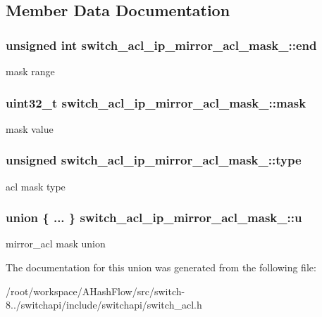 \subsection{Member Data Documentation}
\hypertarget{unionswitch__acl__ip__mirror__acl__mask___ab415589dfee1e4431325003792e78421}{
\subsubsection[{end}]{\setlength{\rightskip}{0pt plus 5cm}unsigned int switch\+\_\+acl\+\_\+ip\+\_\+mirror\+\_\+acl\+\_\+mask\+\_\+\+::end}}\label{unionswitch__acl__ip__mirror__acl__mask___ab415589dfee1e4431325003792e78421}
mask range \hypertarget{unionswitch__acl__ip__mirror__acl__mask___a2293a3ec5e820485c86c6f3f3db73759}{
\subsubsection[{mask}]{\setlength{\rightskip}{0pt plus 5cm}uint32\+\_\+t switch\+\_\+acl\+\_\+ip\+\_\+mirror\+\_\+acl\+\_\+mask\+\_\+\+::mask}}\label{unionswitch__acl__ip__mirror__acl__mask___a2293a3ec5e820485c86c6f3f3db73759}
mask value \hypertarget{unionswitch__acl__ip__mirror__acl__mask___a068e140e14fd896a0651fce09f886a70}{
\subsubsection[{type}]{\setlength{\rightskip}{0pt plus 5cm}unsigned switch\+\_\+acl\+\_\+ip\+\_\+mirror\+\_\+acl\+\_\+mask\+\_\+\+::type}}\label{unionswitch__acl__ip__mirror__acl__mask___a068e140e14fd896a0651fce09f886a70}
acl mask type \hypertarget{unionswitch__acl__ip__mirror__acl__mask___a5a05441a70c21ff2f665269d6a640f7a}{
\subsubsection[{u}]{\setlength{\rightskip}{0pt plus 5cm}union \{ ... \}   switch\+\_\+acl\+\_\+ip\+\_\+mirror\+\_\+acl\+\_\+mask\+\_\+\+::u}}\label{unionswitch__acl__ip__mirror__acl__mask___a5a05441a70c21ff2f665269d6a640f7a}
mirror\+\_\+acl mask union 

The documentation for this union was generated from the following file\+:\begin{DoxyCompactItemize}
\item 
/root/workspace/\+A\+Hash\+Flow/src/switch-\/8../switchapi/include/switchapi/switch\+\_\+acl.\+h\end{DoxyCompactItemize}
